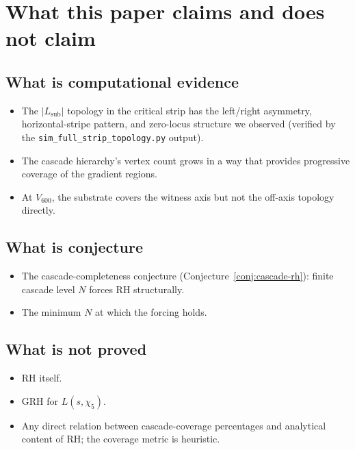 \documentclass[11pt,a4paper]{article}
\newcommand{\Vsix}{V_{600}}
\newcommand{\Lsub}{L_{\mathrm{sub}}}
\begin{document}
\section{What this paper claims and does not claim}
\label{sec:scope}

\subsection{What is computational evidence}

\begin{itemize}[leftmargin=*]
  \item The $|\Lsub|$ topology in the critical strip has the
        left/right asymmetry, horizontal-stripe pattern, and
        zero-locus structure we observed (verified by the
        \texttt{sim\_full\_strip\_topology.py} output).
  \item The cascade hierarchy's vertex count grows in a way that
        provides progressive coverage of the gradient regions.
  \item At $\Vsix$, the substrate covers the witness axis but not
        the off-axis topology directly.
\end{itemize}

\subsection{What is conjecture}

\begin{itemize}[leftmargin=*]
  \item The cascade-completeness conjecture
        (Conjecture~\ref{conj:cascade-rh}): finite cascade level
        $N$ forces RH structurally.
  \item The minimum $N$ at which the forcing holds.
\end{itemize}

\subsection{What is not proved}

\begin{itemize}[leftmargin=*]
  \item RH itself.
  \item GRH for $L(s, \chi_5)$.
  \item Any direct relation between cascade-coverage percentages
        and analytical content of RH; the coverage metric is
        heuristic.
\end{itemize}
\end{document}
